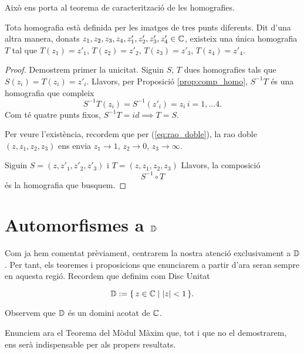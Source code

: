 \documentclass[dvipsnames, svgnames, leqno, a4paper, 12pt]{article}
\begin{document}
    Això ens porta al teorema de caracterització de les homografies.

    \begin{theorem}
        Tota homografia està definida per les imatges de tres punts diferents.
        Dit d'una altra manera, donats $z_1,z_2,z_3,z_4,z'_1,z'_2,z'_3,z'_4\in\mathbb{C}$, existeix una única homografia $T$ tal que $T(z_1)=z'_1$, $T(z_2)=z'_2$, $T(z_3)=z'_3$, $T(z_4)=z'_4$.
    \end{theorem}

    \begin{proof}
        Demostrem primer la unicitat. Siguin $S$, $T$ dues homografies tals que $S(z_i)=T(z_i)=z'_i$. Llavors, per Proposició \ref{prop:comp_homo}, $S^{-1}T$ és una homografia que compleix 
        \begin{displaymath}
            S^{-1}T(z_i)=S^{-1}(z'_i)=z_i\, i=1,\dots4.
        \end{displaymath}
        Com té quatre punts fixos, $S^{-1}T=id\implies T=S$.

        Per veure l'existència, recordem que per (\ref{eq:rao_doble}), la rao doble $(z,z_1,z_2,z_3)$ ens envia $z_1\to1,\, z_2\to0,\, z_3\to\infty$. 

        Siguin $S=(z,z'_1,z'_2,z'_3)$ i $T=(z,z_1,z_2,z_3)$
        Llavors, la composició 
        \begin{displaymath}
            S^{-1}\circ T
        \end{displaymath}
        és la homografia que busquem.
    \end{proof}




\section[Automorfismes al Disc Unitat]{Automorfismes a $\mathbb{D}$}
    Com ja hem comentat prèviament, centrarem la nostra atenció exclusivament a $\mathbb{D}$. Per tant, els teoremes i proposicions que enunciarem a partir d'ara seran sempre en aquesta regió. Recordem que definim com Disc Unitat
    
    \begin{equation*}
            \mathbb{D}:=\{\, z\in\mathbb{C}\mid |z|<1\, \}.
    \end{equation*}

    \noindent Observem que $\mathbb{D}$ és un domini acotat de $\mathbb{C}$.

    Enunciem ara el Teorema del Mòdul Màxim que, tot i que no el demostrarem, ens serà indispensable per als propers resultats. 
    
\end{document}
